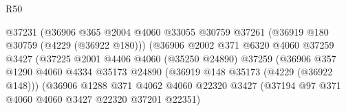 \begin{lexlean}{R50}
\begin{coremodule}
                                          @37231
                                          (@36906
                                            @365
                                            @2004
                                            @4060
                                            @33055
                                            @30759
                                            @37261
                                            (@36919 @180 @30759 (@4229 (@36922 @180)))
                                            (@36906
                                              @2002
                                              @371
                                              @6320
                                              @4060
                                              @37259
                                              @3427
                                              (@37225
                                                @2001
                                                @4406
                                                @4060
                                                (@35250 @24890)
                                                @37259
                                                (@36906
                                                  @357
                                                  @1290
                                                  @4060
                                                  @4334
                                                  @35173
                                                  @24890
                                                  (@36919 @148 @35173 (@4229 (@36922 @148)))
                                                  (@36906
                                                    @1288
                                                    @371
                                                    @4062
                                                    @4060
                                                    @22320
                                                    @3427
                                                    (@37194
                                                      @97
                                                      @371
                                                      @4060
                                                      @4060
                                                      @3427
                                                      @22320
                                                      @37201
                                                      @22351)

\end{coremodule}
\end{lexlean}
